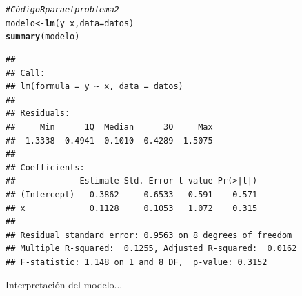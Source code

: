 \documentclass[paper=letter, fontsize=11pt, draft=false]{scrartcl}\usepackage[]{graphicx}\usepackage[]{xcolor}
\makeatletter
\newcommand{\hlcom}[1]{\textcolor[rgb]{0.678,0.584,0.686}{\textit{#1}}}%
\newcommand{\hlopt}[1]{\textcolor[rgb]{0,0,0}{#1}}%
\newcommand{\hldef}[1]{\textcolor[rgb]{0.345,0.345,0.345}{#1}}%
\newcommand{\hlkwb}[1]{\textcolor[rgb]{0.69,0.353,0.396}{#1}}%
\newcommand{\hlkwc}[1]{\textcolor[rgb]{0.333,0.667,0.333}{#1}}%
\newcommand{\hlkwd}[1]{\textcolor[rgb]{0.737,0.353,0.396}{\textbf{#1}}}%
\newenvironment{kframe}{%
 \def\at@end@of@kframe{}%
 \ifinner\ifhmode%
  \def\at@end@of@kframe{\end{minipage}}%
  \begin{minipage}{\columnwidth}%
 \fi\fi%
 \def\FrameCommand##1{\hskip\@totalleftmargin \hskip-\fboxsep
 \colorbox{shadecolor}{##1}\hskip-\fboxsep
     \hskip-\linewidth \hskip-\@totalleftmargin \hskip\columnwidth}%
 \MakeFramed {\advance\hsize-\width
   \@totalleftmargin\z@ \linewidth\hsize
   \@setminipage}}%
 {\par\unskip\endMakeFramed%
 \at@end@of@kframe}
\newenvironment{knitrout}{}{} %
\numberwithin{equation}{problemcounter} %
\numberwithin{figure}{problemcounter} %
\numberwithin{table}{problemcounter} %
\numberwithin{subsection}{problemcounter}
\makeatother
\begin{document}
\begin{knitrout}
\color{fgcolor}\begin{kframe}
\begin{alltt}
\hlcom{# Código R para el problema 2}
\hldef{modelo} \hlkwb{<-} \hlkwd{lm}\hldef{(y} \hlopt{~} \hldef{x,} \hlkwc{data} \hldef{= datos)}
\hlkwd{summary}\hldef{(modelo)}
\end{alltt}
\begin{verbatim}
## 
## Call:
## lm(formula = y ~ x, data = datos)
## 
## Residuals:
##     Min      1Q  Median      3Q     Max 
## -1.3338 -0.4941  0.1010  0.4289  1.5075 
## 
## Coefficients:
##             Estimate Std. Error t value Pr(>|t|)
## (Intercept)  -0.3862     0.6533  -0.591    0.571
## x             0.1128     0.1053   1.072    0.315
## 
## Residual standard error: 0.9563 on 8 degrees of freedom
## Multiple R-squared:  0.1255,	Adjusted R-squared:  0.0162 
## F-statistic: 1.148 on 1 and 8 DF,  p-value: 0.3152
\end{verbatim}
\end{kframe}
\end{knitrout}

Interpretación del modelo...

\newpage

\end{document}
